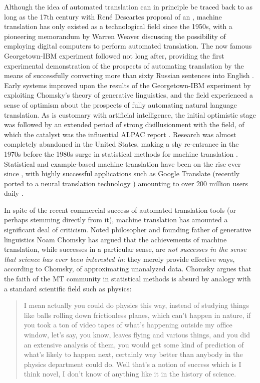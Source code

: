 \documentclass{article}
\begin{document}
Although the idea of automated translation can in principle be traced back to as long as the 17th century with René Descartes proposal of an  \cite{dascal1982universal}, machine translation has only existed as a technological field since the 1950s, with a pioneering memorandum by Warren Weaver \cite{weaver1955translation} discussing the possibility of employing digital computers to perform automated translation. The now famous Georgetown-IBM experiment followed not long after, providing the first experimental demonstration of the prospects of automating translation by the means of successfully converting more than sixty Russian sentences into English \cite{gordin2015scientific}. Early systems improved upon the results of the Georgetown-IBM experiment by exploiting Chomsky's theory of generative linguistics, and the field experienced a sense of optimism about the prospects of fully automating natural language translation. As is customary with artificial intelligence, the initial optimistic stage was followed by an extended period of strong disillusionment with the field, of which the catalyst was the influential ALPAC report \cite{hutchins1986machine}. Research was almost completely abandoned in the United States, making a shy re-entrance in the 1970s before the 1980s surge in statistical methods for machine translation \cite{koehn2009statistical}. Statistical and example-based machine translation have been on the rise ever since \cite{carl2003recent}, with highly successful applications such as Google Translate (recently ported to a neural translation technology \cite{wu2016google}) amounting to over $200$ million users daily \cite{bengio2015deep}.

In spite of the recent commercial success of automated translation tools (or perhaps stemming directly from it), machine translation has amounted a significant deal of criticism. Noted philosopher and founding father of generative linguistics Noam Chomsky has argued that the achievements of machine translation, while successes in a particular sense, are \emph{not successes in the sense that science has ever been interested in}: they merely provide effective ways, according to Chomsky, of approximating unanalyzed data. Chomsky argues that the faith of the MT community in statistical methods is absurd by analogy with a standard scientific field such as physics:

\begin{quotation}
I mean actually you could do physics this way, instead of studying things like balls rolling down frictionless planes, which can't happen in nature, if you took a ton of video tapes of what's happening outside my office window, let's say, you know, leaves flying and various things, and you did an extensive analysis of them, you would get some kind of prediction of what's likely to happen next, certainly way better than anybody in the physics department could do. Well that's a notion of success which is I think novel, I don't know of anything like it in the history of science.
\end{quotation}
\end{document}

